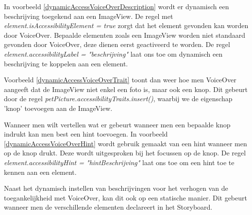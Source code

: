 In voorbeeld \ref{dynamicAccessVoiceOverDescription} wordt er dynamisch een beschrijving toegekend aan een ImageView. De regel met \emph{element.isAccessibilityElement = true} zorgt dat het element gevonden kan worden door VoiceOver.  Bepaalde elementen zoals een ImageView worden niet standaard gevonden door VoiceOver, deze dienen eerst geactiveerd te worden. De regel \emph{element.accessibilityLabel = "beschrijving"} laat ons toe om dynamisch een beschrijving te koppelen aan een element.

    

Voorbeeld \ref{dynamicAccessVoiceOverTrait} toont dan weer hoe men VoiceOver aangeeft dat de ImageView niet enkel een foto is, maar ook een knop. Dit gebeurt door de regel \emph{petPicture.accessibilityTraits.insert()}, waarbij we de eigenschap 'knop' toevoegen aan de ImageView.

    
    Wanneer men wilt vertellen wat er gebeurt wanneer men een bepaalde knop indrukt kan men best een hint toevoegen. In voorbeeld \ref{dynamicAccessVoiceOverHint} wordt gebruik gemaakt van een hint wanneer men op de knop drukt. Deze wordt uitgesproken bij het focussen op de knop. De regel \emph{element.accessibilityHint = "hintBeschrijving"} laat ons toe om een hint toe te kennen aan een element.
    
   Naast het dynamisch instellen van beschrijvingen voor het verhogen van de toegankelijkheid met VoiceOver, kan dit ook op een statische manier. Dit gebeurt wanneer men de verschillende elementen declareert in het Storyboard.
   
